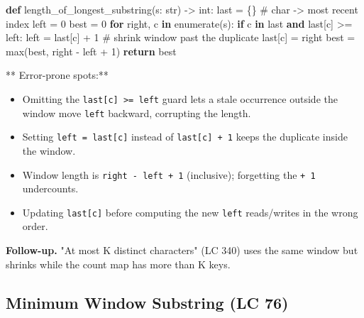 \documentclass[11pt]{article}
\providecommand{\tightlist}{\setlength{\itemsep}{1pt}\setlength{\parskip}{0pt}}
\newenvironment{Shaded}{\begin{snugshade}}{\end{snugshade}}
\newcommand{\BuiltInTok}[1]{\textcolor[rgb]{0.50,0.55,0.55}{#1}}
\newcommand{\CommentTok}[1]{\textcolor[rgb]{0.48,0.49,0.49}{#1}}
\newcommand{\ControlFlowTok}[1]{\textcolor[rgb]{0.99,0.74,0.29}{\textbf{#1}}}
\newcommand{\DecValTok}[1]{\textcolor[rgb]{0.96,0.45,0.00}{#1}}
\newcommand{\KeywordTok}[1]{\textcolor[rgb]{0.81,0.81,0.76}{\textbf{#1}}}
\newcommand{\NormalTok}[1]{\textcolor[rgb]{0.81,0.81,0.76}{#1}}
\newcommand{\OperatorTok}[1]{\textcolor[rgb]{0.81,0.81,0.76}{#1}}
\begin{document}

\begin{Shaded}
\begin{Highlighting}[]
\KeywordTok{def}\NormalTok{ length\_of\_longest\_substring(s: }\BuiltInTok{str}\NormalTok{) }\OperatorTok{{-}\textgreater{}} \BuiltInTok{int}\NormalTok{:}
\NormalTok{    last }\OperatorTok{=}\NormalTok{ \{\}          }\CommentTok{\# char {-}\textgreater{} most recent index}
\NormalTok{    left }\OperatorTok{=} \DecValTok{0}
\NormalTok{    best }\OperatorTok{=} \DecValTok{0}
    \ControlFlowTok{for}\NormalTok{ right, c }\KeywordTok{in} \BuiltInTok{enumerate}\NormalTok{(s):}
        \ControlFlowTok{if}\NormalTok{ c }\KeywordTok{in}\NormalTok{ last }\KeywordTok{and}\NormalTok{ last[c] }\OperatorTok{\textgreater{}=}\NormalTok{ left:}
\NormalTok{            left }\OperatorTok{=}\NormalTok{ last[c] }\OperatorTok{+} \DecValTok{1}      \CommentTok{\# shrink window past the duplicate}
\NormalTok{        last[c] }\OperatorTok{=}\NormalTok{ right}
\NormalTok{        best }\OperatorTok{=} \BuiltInTok{max}\NormalTok{(best, right }\OperatorTok{{-}}\NormalTok{ left }\OperatorTok{+} \DecValTok{1}\NormalTok{)}
    \ControlFlowTok{return}\NormalTok{ best}
\end{Highlighting}
\end{Shaded}

** Error-prone spots:**

\begin{itemize}
\tightlist
\item
  Omitting the \texttt{last{[}c{]}\ \textgreater{}=\ left} guard lets a stale occurrence outside the window move \texttt{left} backward, corrupting the length.
\item
  Setting \texttt{left\ =\ last{[}c{]}} instead of \texttt{last{[}c{]}\ +\ 1} keeps the duplicate inside the window.
\item
  Window length is \texttt{right\ -\ left\ +\ 1} (inclusive); forgetting the \texttt{+\ 1} undercounts.
\item
  Updating \texttt{last{[}c{]}} before computing the new \texttt{left} reads/writes in the wrong order.
\end{itemize}

\textbf{Follow-up.} "At most K distinct characters" (LC 340) uses the same window but shrinks while the count map has more than K keys.

\subsection{Minimum Window Substring (LC 76)}\label{minimum-window-substring-lc-76}
\end{document}

